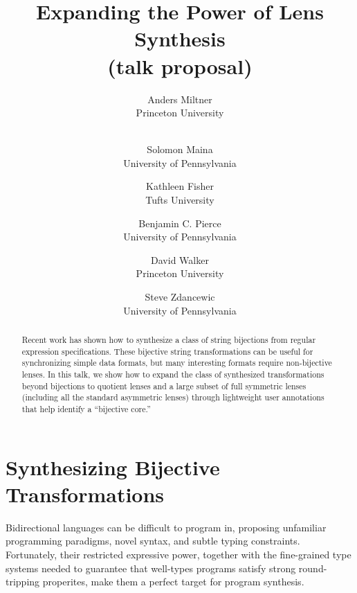 \documentclass[a4paper]{article}
\title{Expanding the Power of Lens Synthesis \\ (talk proposal)}
\author{
Anders Miltner \\ Princeton University \\ \ 
\and
Solomon Maina \\ University of Pennsylvania
\and
Kathleen Fisher \\ Tufts University
\and
Benjamin C. Pierce \\ University of Pennsylvania
\and
David Walker \\ Princeton University
\and
Steve Zdancewic \\ University of Pennsylvania
}
\begin{document}
\maketitle



\vspace*{-3em}

\begin{abstract}
  Recent work
  has shown how to synthesize a class of string bijections from regular
  expression specifications. These bijective string transformations can be
  useful for synchronizing simple data formats, but many interesting formats
  require non-bijective lenses. In this talk, we show how to expand the class of
  synthesized transformations beyond bijections to quotient lenses and a large
  subset of full symmetric lenses (including all the standard asymmetric lenses)
  through lightweight user annotations that help identify a ``bijective core.''
\end{abstract}

\section{Synthesizing Bijective Transformations}

Bidirectional languages can be difficult to program in, proposing unfamiliar
programming paradigms, novel syntax, and subtle typing constraints.
Fortunately, their restricted expressive power, together with the
fine-grained type systems needed to guarantee that well-types programs
satisfy strong round-tripping properites, make them a perfect target for
program synthesis.  
\end{document}
